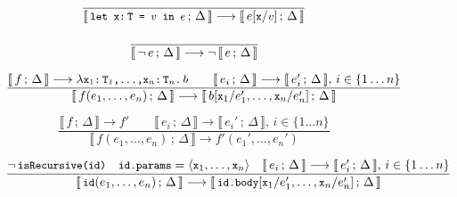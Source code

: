 \documentclass[a4paper,twoside]{article}
\newcommand{\lb}[2]{\llbracket\, #1\,;\, #2\, \rrbracket}
\newcommand{\TODO}[1]{\textcolor{YellowOrange}{(TODO: #1)}} %
\newcommand{\stt}[1]{\texttt{\small{#1}}}
\begin{document}

\begin{landscape}
\begin{figure}[htb]\ContinuedFloat
\centering
\begin{framed}

\begin{equation}
\dfrac{
}{
  \lb{\stt{let x:\,T = $v$ in $e$}}{\Delta} \longrightarrow
  \lb{e[\stt{x}/\stt{$v$}]}{\Delta}
}
\end{equation}



\begin{equation}
\dfrac{
  \empty
}{
  \lb{\neg\, e}{\Delta} \longrightarrow \neg\,\lb{e}{\Delta}
}
\end{equation}

\begin{equation}
\dfrac{
  \lb{f}{\Delta} \longrightarrow \lambda \stt{x$_1$:\,T$_1$,\ldots,x$_n$:\,T$_n$.\,$b$}
  \qquad
  \lb{e_i}{\Delta} \longrightarrow \lb{e_i'}{\Delta},\, i \in \{1 \ldots n\}
}{
  \lb{f(e_1,\ldots,e_n)}{\Delta} \longrightarrow
  \lb{b[\stt{x}_1/e_1',\ldots,\stt{x}_n/e_n']}{\Delta}
}
\end{equation}

\begin{equation}
\dfrac{
  \lb{f}{\Delta} \longrightarrow f' \qquad
  \lb{e_i}{\Delta} \longrightarrow \lb{e_i'}{\Delta},\, i \in \{1 \ldots n\}
}{
  \lb{f(e_1,\ldots,e_n)}{\Delta} \longrightarrow
  f'(e_1', \ldots, e_n')
}
\end{equation}


\begin{equation}
\dfrac{
 \neg\,\stt{isRecursive(id)} \quad
 \stt{id.params} = \langle \stt{x}_1, \ldots, \stt{x}_n \rangle \quad
 \lb{e_i}{\Delta} \longrightarrow \lb{e_i'}{\Delta},\, i \in \{1 \ldots n\}
}{
  \lb{\stt{id}(e_1,\ldots,e_n)}{\Delta} \longrightarrow
  \lb{\stt{id.body}[\stt{x}_1/e_1',\ldots,\stt{x}_n/e_n']}{\Delta}
}
\label{fig:symbolicsem:fi1}
\end{equation}


\end{framed}
\end{figure}
\end{landscape}
\end{document}
